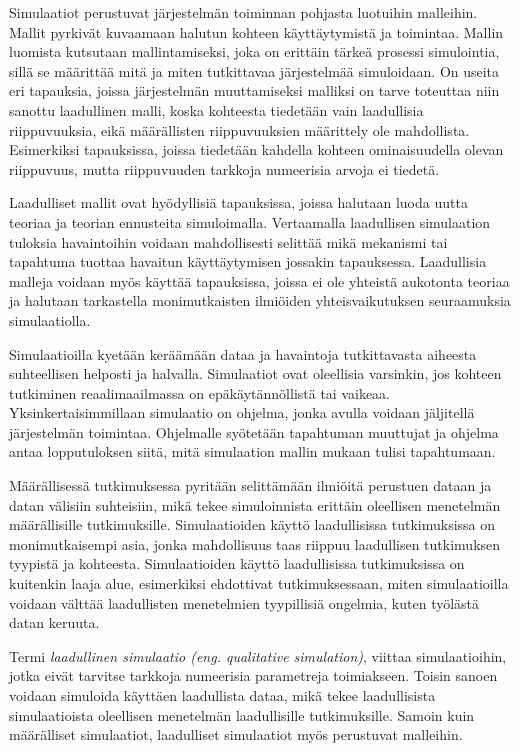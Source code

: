 \documentclass[utf8]{gradu3}
\begin{document}
Simulaatiot perustuvat järjestelmän toiminnan pohjasta luotuihin malleihin.
Mallit pyrkivät kuvaamaan halutun kohteen käyttäytymistä ja toimintaa. 
Mallin luomista kutsutaan mallintamiseksi, joka on erittäin tärkeä prosessi simulointia,
sillä se määrittää mitä ja miten tutkittavaa järjestelmää simuloidaan. 
On useita eri tapauksia, joissa järjestelmän muuttamiseksi malliksi 
on tarve toteuttaa niin sanottu laadullinen malli, koska kohteesta tiedetään vain laadullisia riippuvuuksia, eikä määrällisten riippuvuuksien määrittely ole mahdollista.
Esimerkiksi tapauksissa, joissa tiedetään kahdella 
kohteen ominaisuudella olevan riippuvuus, 
mutta riippuvuuden tarkkoja numeerisia arvoja ei tiedetä.

Laadulliset mallit ovat hyödyllisiä tapauksissa, joissa halutaan luoda uutta teoriaa ja teorian ennusteita simuloimalla. Vertaamalla laadullisen simulaation tuloksia havaintoihin 
voidaan mahdollisesti selittää mikä mekanismi tai tapahtuma tuottaa havaitun käyttäytymisen jossakin tapauksessa.
Laadullisia malleja voidaan myös käyttää tapauksissa, joissa ei ole yhteistä aukotonta teoriaa ja halutaan tarkastella monimutkaisten ilmiöiden yhteisvaikutuksen seuraamuksia simulaatiolla.

Simulaatioilla kyetään keräämään dataa ja havaintoja tutkittavasta 
aiheesta suhteellisen helposti ja halvalla. 
Simulaatiot ovat oleellisia varsinkin, jos kohteen tutkiminen reaalimaailmassa on 
epäkäytännöllistä tai vaikeaa.
Yksinkertaisimmillaan simulaatio on ohjelma, jonka avulla voidaan jäljitellä järjestelmän toimintaa. Ohjelmalle syötetään tapahtuman muuttujat ja ohjelma antaa lopputuloksen siitä, mitä simulaation mallin mukaan tulisi tapahtumaan. 

Määrällisessä tutkimuksessa pyritään selittämään 
ilmiöitä perustuen dataan ja datan välisiin suhteisiin, 
mikä tekee simuloinnista erittäin oleellisen menetelmän määrällisille tutkimuksille. 
Simulaatioiden käyttö laadullisissa tutkimuksissa on monimutkaisempi asia, 
jonka mahdollisuus taas riippuu laadullisen tutkimuksen tyypistä ja kohteesta. 
Simulaatioiden käyttö laadullisissa tutkimuksissa on kuitenkin laaja alue, 
esimerkiksi \textcite{eldabi2002quantitative} ehdottivat tutkimuksessaan, miten simulaatioilla voidaan välttää laadullisten menetelmien tyypillisiä ongelmia, kuten työlästä datan keruuta. 

Termi \textit{laadullinen simulaatio (eng. qualitative simulation)},
viittaa simulaatioihin, 
jotka eivät tarvitse tarkkoja numeerisia parametreja toimiakseen. 
Toisin sanoen voidaan simuloida käyttäen laadullista dataa, mikä tekee 
laadullisista simulaatioista oleellisen menetelmän laadullisille tutkimuksille. 
Samoin kuin määrälliset simulaatiot, laadulliset simulaatiot myös perustuvat malleihin.
\end{document}
